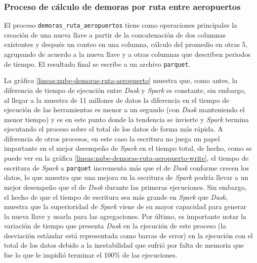 \subsubsection{Proceso de cálculo de demoras por ruta entre aeropuertos}

El proceso \texttt{demoras\_ruta\_aeropuertos} tiene como operaciones principales  la creación de una nueva llave a partir de la concatenación de dos columnas existentes y después un conteo en una columna, cálculo del promedio en otras 5, agrupando de acuerdo a la nueva llave y a otras columnas que describen periodos de tiempo. El resultado final se escribe a un archivo \texttt{parquet}.

La gráfica \ref{lineas:nube-demoras-ruta-aeropuerto}
muestra que, como antes, la diferencia de tiempo de ejecución entre \textit{Dask} y \textit{Spark} es constante, sin embargo, al llegar a la muestra de 11 millones de datos la diferencia en el tiempo de ejecución de las herramientas es menor a un segundo (con \textit{Dask} manteniendo el menor tiempo) y es en este punto donde la tendencia se invierte y \textit{Spark} termina ejecutando el proceso sobre el total de los datos de forma más rápida. A diferencia de otros procesos, en este caso la escritura no juega un papel importante en el mejor desempeño de \textit{Spark} en el tiempo total, de hecho, como se puede ver en la gráfica \ref{lineas:nube-demoras-ruta-aeropuerto-write}, el tiempo de escritura de \textit{Spark} a \texttt{parquet} incrementa más que el de \textit{Dask} conforme crecen los datos, lo que 
muestra que una mejora en la escritura de \textit{Spark} podría llevar a un mejor desempeño que el de \textit{Dask} durante las primeras ejecuciones. Sin embargo, el hecho de que el tiempo de escritura sea más grande en \textit{Spark} que \textit{Dask}, muestra que la superioridad de \textit{Spark} viene de su mayor capacidad para generar la nueva llave y usarla para las agregaciones. Por último, es importante notar la variación de tiempo que presenta  \textit{Dask} en la ejecución de este proceso (la desviación estándar está representada como barras de error) en la ejecución con el total de los datos debido a la inestabilidad que sufrió por falta de memoria que fue lo que le impidió terminar el 100\% de las ejecuciones. 

